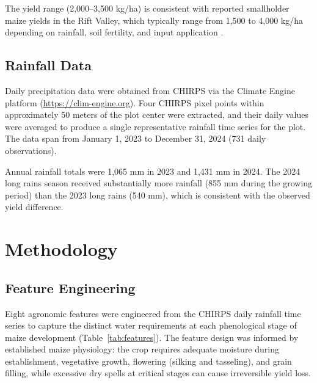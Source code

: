 \documentclass[11pt,a4paper]{article}
\begin{document}
The yield range (2,000--3,500 kg/ha) is consistent with reported smallholder maize yields in the Rift Valley, which typically range from 1,500 to 4,000 kg/ha depending on rainfall, soil fertility, and input application \cite{kanampiu2002}.

\subsection{Rainfall Data}

Daily precipitation data were obtained from CHIRPS via the Climate Engine platform (\url{https://clim-engine.org}). Four CHIRPS pixel points within approximately 50 meters of the plot center were extracted, and their daily values were averaged to produce a single representative rainfall time series for the plot. The data span from January 1, 2023 to December 31, 2024 (731 daily observations).

Annual rainfall totals were 1,065 mm in 2023 and 1,431 mm in 2024. The 2024 long rains season received substantially more rainfall (855 mm during the growing period) than the 2023 long rains (540 mm), which is consistent with the observed yield difference.

\section{Methodology}

\subsection{Feature Engineering}

Eight agronomic features were engineered from the CHIRPS daily rainfall time series to capture the distinct water requirements at each phenological stage of maize development (Table~\ref{tab:features}). The feature design was informed by established maize physiology: the crop requires adequate moisture during establishment, vegetative growth, flowering (silking and tasseling), and grain filling, while excessive dry spells at critical stages can cause irreversible yield loss.
\end{document}
